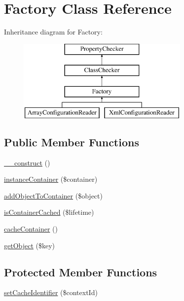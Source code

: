 \hypertarget{class_factory}{\section{Factory Class Reference}
\label{class_factory}
}
Inheritance diagram for Factory\-:\begin{figure}[H]
\begin{center}
\leavevmode
\includegraphics[height=4.000000cm]{class_factory}
\end{center}
\end{figure}
\subsection*{Public Member Functions}
\begin{DoxyCompactItemize}
\item 
\hyperlink{class_factory_a095c5d389db211932136b53f25f39685}{\-\_\-\-\_\-construct} ()
\item 
\hyperlink{class_factory_a1c472cdd39af8f4201646181105a7fa1}{instance\-Container} (\$container)
\item 
\hyperlink{class_factory_a6987b05993ea9cf488ff8224f08f7cc8}{add\-Object\-To\-Container} (\$object)
\item 
\hyperlink{class_factory_aaefbaf9f91b8697ec84bea5a581d0e0e}{is\-Container\-Cached} (\$lifetime)
\item 
\hyperlink{class_factory_a039004a4b26016152db14bebcef6d4d6}{cache\-Container} ()
\item 
\hyperlink{class_factory_a09620fce23d46253525756869a03d51f}{get\-Object} (\$key)
\end{DoxyCompactItemize}
\subsection*{Protected Member Functions}
\begin{DoxyCompactItemize}
\item 
\hyperlink{class_factory_a05ddaec7a787b0f9f0ce714e5d3734bb}{set\-Cache\-Identifier} (\$context\-Id)
\end{DoxyCompactItemize}


